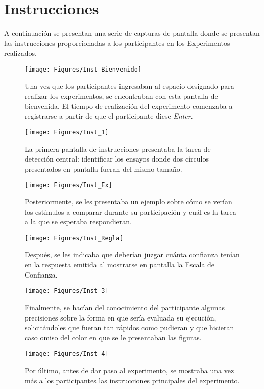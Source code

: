 
\chapter{Instrucciones} %

\label{App_Inst} %

A continuación se presentan una serie de capturas de pantalla donde se presentan las instrucciones proporcionadas a los participantes en los Experimentos realizados.\\

\begin{figure}[th]
\centering
\texttt{[image: Figures/Inst\_Bienvenido]} 
\decoRule
\caption[Pantalla de Bienvenida]{Una vez que los participantes ingresaban al espacio designado para realizar los experimentos, se encontraban con esta pantalla de bienvenida. El tiempo de realización del experimento comenzaba a registrarse a partir de que el participante diese \textit{Enter}.}
\label{fig:csv}
\end{figure}

\begin{figure}[th]
\centering
\texttt{[image: Figures/Inst\_1]} 
\decoRule
\caption[Pantalla de Bienvenida]{La primera pantalla de instrucciones presentaba la tarea de detección central: identificar los ensayos donde dos círculos presentados en pantalla fueran del mismo tamaño.}
\label{fig:csv}
\end{figure}

\begin{figure}[th]
\centering
\texttt{[image: Figures/Inst\_Ex]} 
\decoRule
\caption[Pantalla de Bienvenida]{Posteriormente, se les presentaba un ejemplo sobre cómo se verían los estímulos a comparar durante su participación y cuál es la tarea a la que se esperaba respondieran.}
\label{fig:csv}
\end{figure}

\begin{figure}[th]
\centering
\texttt{[image: Figures/Inst\_Regla]} 
\decoRule
\caption[Pantalla de Bienvenida]{Después, se les indicaba que deberían juzgar cuánta confianza tenían en la respuesta emitida al mostrarse en pantalla la Escala de Confianza.}
\label{fig:csv}
\end{figure}

\begin{figure}[th]
\centering
\texttt{[image: Figures/Inst\_3]} 
\decoRule
\caption[Pantalla de Bienvenida]{Finalmente, se hacían del conocimiento del participante algunas precisiones sobre la forma en que sería evaluada su ejecución, solicitándoles que fueran tan rápidos como pudieran y que hicieran caso omiso del color en que se le presentaban las figuras.}
\label{fig:csv}
\end{figure}

\begin{figure}[th]
\centering
\texttt{[image: Figures/Inst\_4]} 
\decoRule
\caption[Pantalla de Bienvenida]{Por último, antes de dar paso al experimento, se mostraba una vez más a los participantes las instrucciones principales del experimento.}
\label{fig:csv}
\end{figure}

